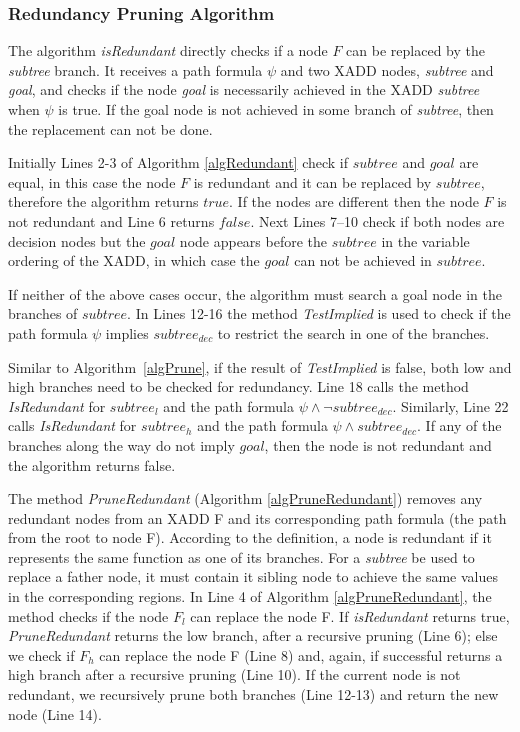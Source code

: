 \documentclass[twoside,11pt]{article}
\begin{document}
\subsubsection{Redundancy Pruning Algorithm}
\label{redundancyprunning}

The algorithm \emph{isRedundant} directly checks if a node $F$ can be replaced by the \emph{subtree} branch. It receives a path formula $\psi$ and two XADD nodes, \emph{subtree} and \emph{goal}, and checks if the node \emph{goal} is necessarily achieved in the XADD \emph{subtree} when $\psi$ is true. If the goal node is not achieved in some branch of \emph{subtree}, then the replacement can not be done. 

Initially Lines 2-3 of Algorithm \ref{algRedundant} check if $\mathit{subtree}$ and $\mathit{goal}$ are equal, in this case the node $F$ is redundant and it can be replaced by $\mathit{subtree}$, therefore the algorithm returns $\mathit{true}$. If the nodes are different then the node $F$ is not redundant and Line 6 returns $\mathit{false}$. Next Lines 7--10 check if both nodes are decision nodes but the $\mathit{goal}$ node appears before the $\mathit{subtree}$ in the variable ordering of the XADD, in which case the $\mathit{goal}$ can not be achieved in $\mathit{subtree}$. 

If neither of the above cases occur, the algorithm must search a goal node in the branches of $\mathit{subtree}$. In Lines 12-16 the method \emph{TestImplied} is used to check if the path formula $\psi$ implies $subtree_{dec}$ to restrict the search in one of the branches.   

Similar to Algorithm~\ref{algPrune}, if the result of \emph{TestImplied} is false, both low and high branches need to be checked for redundancy. Line 18 calls the method \emph{IsRedundant} for $\mathit{subtree}_l$ and the path formula $\psi \wedge \neg subtree_{dec}$. Similarly, Line 22 calls \emph{IsRedundant} for $\mathit{subtree}_h$ and the path formula $\psi \wedge subtree_{dec}$. If any of the branches along the way do not imply $\mathit{goal}$, then the node is not redundant and the algorithm returns false. 

The method \emph{PruneRedundant} (Algorithm \ref{algPruneRedundant}) removes any redundant nodes from an XADD F and its corresponding path formula (the path from the root to node F). According to the definition, a node is redundant if it represents the same function as one of its branches. For a \emph{subtree} be used to replace a father node, it must contain it sibling node to achieve the same values in the corresponding regions. In Line 4 of Algorithm \ref{algPruneRedundant}, the method checks if the node $F_l$ can replace the node F. If \emph{isRedundant} returns true, \emph{PruneRedundant} returns the low branch, after a recursive pruning (Line 6); else we check if $F_h$ can replace the node F (Line 8) and, again, if successful returns a high branch after a recursive pruning (Line 10). If the current node is not redundant, we recursively prune both branches (Line 12-13) and return the new node (Line 14). 
\end{document}
